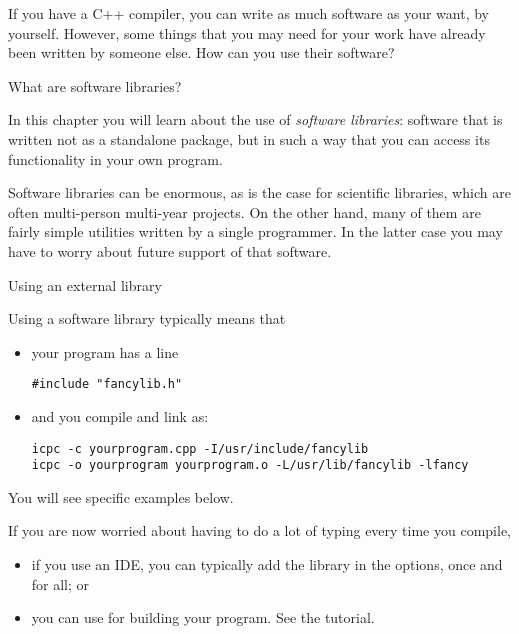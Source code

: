 
If you have a C++ compiler,
you can write as much software as your want, by yourself.
However, some things that you may need for your work
have already been written by someone else.
How can you use their software?

 {What are software libraries?}
\label{sec:makelib}

In this chapter you will learn about the use of
\emph{software libraries}:
software that is written not as a standalone package,
but in such a way that you can access its functionality
in your own program.

Software libraries can be enormous,
as is the case for scientific libraries,
which are often multi-person multi-year projects.
On the other hand, many of them
are fairly simple utilities written by a single programmer.
In the latter case you may have to worry about
future support of that software.

 {Using an external library}

Using a software library typically means that
\begin{itemize}
\item your program has a line
\begin{lstlisting}
#include "fancylib.h"
\end{lstlisting}
\item and you compile and link as:
\begin{verbatim}
icpc -c yourprogram.cpp -I/usr/include/fancylib
icpc -o yourprogram yourprogram.o -L/usr/lib/fancylib -lfancy
\end{verbatim}
\end{itemize}
You will see specific examples below.

If you are now worried about having to do a lot of typing every time you compile,
\begin{itemize}
\item if you use an \ac{IDE}, you can typically add the library in the options,
  once and for all; or
\item you can use  for building your program.
  See the tutorial.
\end{itemize}

